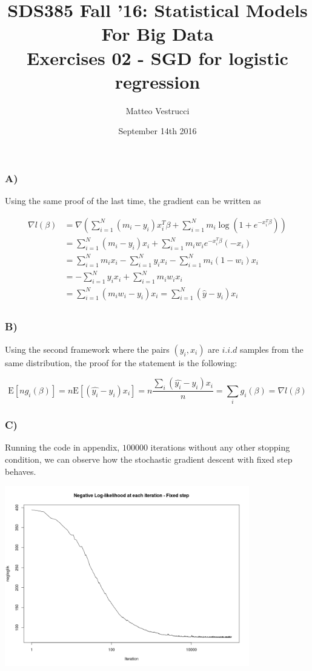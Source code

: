 \documentclass{article}
\title{SDS385 Fall '16: Statistical Models For Big Data\\Exercises 02 - SGD for logistic regression}
\author{Matteo Vestrucci}
\date{September 14th 2016}
\begin{document}
\maketitle
\bigskip\bigskip\bigskip

\subsubsection*{A)}

Using the same proof of the last time, the gradient can be written as

\begin{align*}
\nabla l(\beta)&=\nabla\left(\sum_{i=1}^N (m_i-y_i) x_i^T\beta+\sum_{i=1}^N m_i \log(1+e^{-x_i^T\beta})\right)\\
				&=\sum_{i=1}^N (m_i-y_i) x_i+\sum_{i=1}^N m_i w_i e^{-x_i^T\beta}(-x_i)\\
				&=\sum_{i=1}^N m_i x_i-\sum_{i=1}^N y_i x_i-\sum_{i=1}^N m_i (1-w_i) x_i\\
				&=-\sum_{i=1}^N y_i x_i+\sum_{i=1}^N m_i w_i x_i\\
				&=\sum_{i=1}^N (m_i w_i-y_i)x_i=\sum_{i=1}^N (\hat{y}-y_i)x_i\\
\end{align*}

\subsubsection*{B)}

Using the second framework where the pairs $(y_i,x_i)$ are $i.i.d$ samples from the same distribution, the proof for the statement is the following:

\begin{equation*}
\text{E}[ng_i(\beta)]=n\text{E}[(\hat{y_i}-y_i)x_i]=n\frac{\sum_i (\hat{y_i}-y_i)x_i}{n}={\sum}_i g_i(\beta)=\nabla l(\beta)
\end{equation*}

\subsubsection*{C)}

Running the code in appendix, $100000$ iterations without any other stopping condition, we can observe how the stochastic gradient descent with fixed step behaves.

\begin{center}
\includegraphics[width=0.8\textwidth]{Rplot_total_negloglik.png} 
\end{center}
\end{document}
